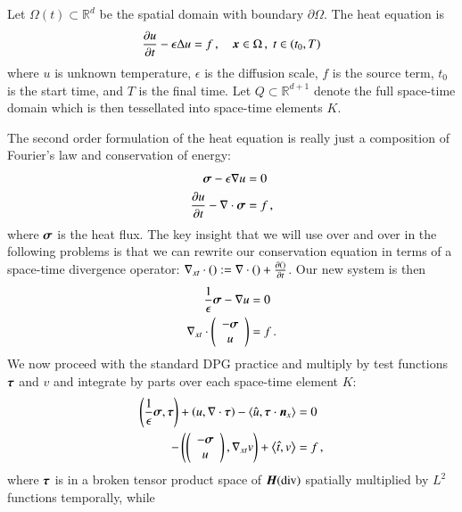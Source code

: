 \documentclass[preprint,12pt]{elsarticle}
\begin{document}
Let $\Omega(t)\subset\mathbb{R}^d$ be the spatial domain with boundary $\partial\Omega$.
The heat equation is
\begin{equation}
	\frac{\partial u}{\partial t}-\epsilon\Delta u=f\,,\quad\boldsymbol x\in\Omega\,,\;t\in(t_0,T)
\end{equation}
where $u$ is unknown temperature, $\epsilon$ is the diffusion scale, $f$ is the source term, $t_0$ is the start time, and $T$ is the final time.
Let $Q\subset\mathbb{R}^{d+1}$ denote the full space-time domain which is then tessellated into space-time elements $K$.

The second order formulation of the heat equation is really just a composition of Fourier's law and conservation of energy:
\begin{equation}
\label{eq:heatFirstOrder}
\begin{aligned}
\boldsymbol\sigma-\epsilon\nabla u&=0\\
\frac{\partial u}{\partial t}-\nabla\cdot\boldsymbol\sigma&=f\,,
\end{aligned}
\end{equation}
where $\boldsymbol\sigma$ is the heat flux.
The key insight that we will use over and over in the following problems is that we can rewrite our conservation equation
in terms of a space-time divergence operator: $\nabla_{xt}\cdot():=\nabla\cdot()+\frac{\partial()}{\partial t}$.
Our new system is then
\begin{equation}
\label{eq:heatFirstOrderSpaceTime}
\begin{aligned}
\frac{1}{\epsilon}\boldsymbol\sigma-\nabla u&=0\\
\nabla_{xt}\cdot\left( \begin{array}{c} -\boldsymbol\sigma\\ u\\ \end{array} \right)&=f\,.
\end{aligned}
\end{equation}
We now proceed with the standard DPG practice and multiply by test functions $\boldsymbol\tau$ and $v$ 
and integrate by parts over each space-time element $K$:
\begin{equation}
\label{eq:heatBF}
\begin{aligned}
\left( \frac{1}{\epsilon}\boldsymbol\sigma,\boldsymbol\tau \right)+\left( u,\nabla\cdot\boldsymbol\tau \right)-\left\langle \hat u,\boldsymbol\tau\cdot\boldsymbol n_x \right\rangle&=0\\
-\left( \left( \begin{array}{c} -\boldsymbol\sigma\\ u\\ \end{array} \right),\nabla_{xt} v \right)+\left\langle \hat t,v \right\rangle&=f\,,
\end{aligned}
\end{equation}
where
$\boldsymbol\tau$ is in a broken tensor product space of $\mbox{\boldmath $H$}(\text{div})$ spatially multiplied by $L^2$ functions temporally, while 
\end{document}
